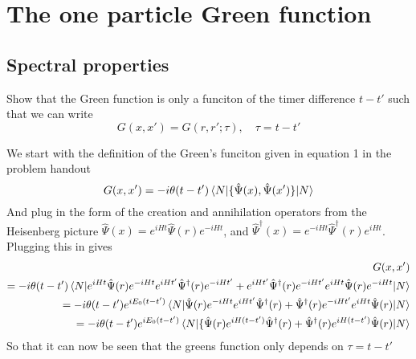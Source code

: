 \section{The one particle Green function}
\subsection{Spectral properties}



\begin{exercise}
Show that the Green function is only a funciton of the timer difference $t-t'$ such that we can write
\begin{equation}
    G(x,x') = G(r,r';\tau), \quad \tau = t-t'
\end{equation}
\end{exercise}

\begin{solution}
We start with the definition of the Green's funciton given in equation 1 in the problem handout
\begin{equation}\label{eq:generalGreens}
    G(x,x') = -i \theta(t-t') \mel{N}{\{\hat{\Psi}(x),\hat{\Psi}(x')\}}{N}
\end{equation}
And plug in the form of the creation and annihilation operators from the Heisenberg picture $\hat{\Psi}(x) = e^{iHt}\hat{\Psi}(r)e^{-iHt}$, and $\hat{\Psi}^{\dagger}(x) = e^{-iHt}\hat{\Psi}^{\dagger}(r)e^{iHt}$. Plugging this in gives
\begin{equation}
\begin{split}
    G(x,x') \\
    = -i \theta(t-t') \mel{N}{e^{iHt}\hat{\Psi}(r)e^{-iHt}e^{iHt'}\hat{\Psi}^{\dagger}(r)e^{-iHt'} + e^{iHt'}\hat{\Psi}^{\dagger}(r)e^{-iHt'}e^{iHt}\hat{\Psi}(r)e^{-iHt} }{N} \\
    = -i \theta(t-t') e^{iE_0(t-t')} \mel{N}{\hat{\Psi}(r)e^{-iHt}e^{iHt'}\hat{\Psi}^{\dagger}(r) + \hat{\Psi}^{\dagger}(r)e^{-iHt'}e^{iHt}\hat{\Psi}(r) }{N} \\
    = -i \theta(t-t') e^{iE_0(t-t')} \mel{N}{\{\hat{\Psi}(r)e^{iH(t-t')}\hat{\Psi}^{\dagger}(r) + \hat{\Psi}^{\dagger}(r)e^{iH(t-t')}\hat{\Psi}(r)}{N} 
\end{split}
\end{equation}
So that it can now be seen that the greens function only depends on $\tau = t-t'$
\end{solution}



